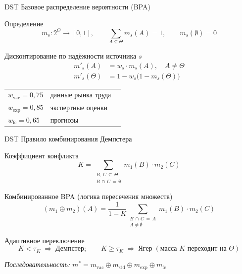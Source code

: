 \documentclass[12pt]{beamer}
\begin{document}
\begin{frame}{DST \textendash{} Базовое распределение вероятности (BPA)}

  \begin{block}{Определение}
    \[
      m_s : 2^\Theta \to [0,1],\qquad
      \sum_{A \subseteq \Theta} m_s(A) = 1,\qquad
      m_s(\emptyset) = 0
    \]
  \end{block}

  \begin{block}{Дисконтирование по надёжности источника $s$}
    \begin{align*}
      m'_s(A)      &= w_s \cdot m_s(A), \quad A \neq \Theta \\[4pt]
      m'_s(\Theta) &= 1 - w_s\bigl(1 - m_s(\Theta)\bigr)
    \end{align*}
  \end{block}

  \bigskip
  \begin{tabular}{lll}
    $w_{\mathrm{vac}} = 0{,}75$ & данные рынка труда \\
    $w_{\mathrm{exp}} = 0{,}85$ & экспертные оценки \\
    $w_{\mathrm{fc}}  = 0{,}65$ & прогнозы \\
  \end{tabular}
\end{frame}

\begin{frame}{DST \textendash{} Правило комбинирования Демпстера}

  \begin{block}{Коэффициент конфликта}
    \[
      K = \sum_{\substack{B,\,C \,\subseteq\, \Theta \\ B \,\cap\, C \,=\, \emptyset}}
            m_1(B) \cdot m_2(C)
    \]
  \end{block}

  \begin{block}{Комбинированное BPA \textnormal{(логика пересечения множеств)}}
    \[
      (m_1 \oplus m_2)(A) =
      \frac{1}{1 - K}
      \sum_{\substack{B \,\cap\, C \,=\, A \\ A \neq \emptyset}}
        m_1(B) \cdot m_2(C)
    \]
  \end{block}

  \begin{block}{Адаптивное переключение}
    \[
      K < \tau_K \;\Rightarrow\; \text{Демпстер};\qquad
      K \geq \tau_K \;\Rightarrow\; \text{Ягер}
      \;(\text{масса } K \text{ переходит на } \Theta)
    \]
  \end{block}

  \smallskip
  \textit{Последовательность:
    $m^* = m_{\mathrm{vac}} \oplus m_{\mathrm{std}} \oplus m_{\mathrm{exp}} \oplus m_{\mathrm{fc}}$}
\end{frame}
\end{document}
